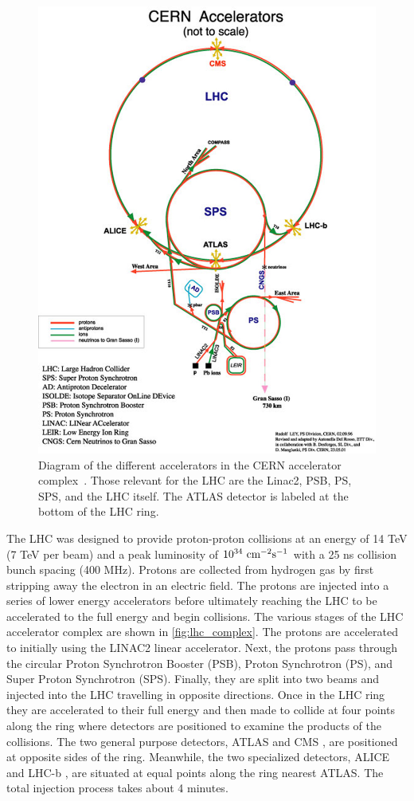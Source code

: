 \begin{figure}[ht!]
\centering
\includegraphics[width=.8\textwidth]{figures/lhc/complex.jpg}
\caption{Diagram of the different accelerators in the CERN accelerator
complex~\cite{lhccomplex}. Those relevant for the LHC are the Linac2, PSB, PS, SPS, and the LHC itself. The ATLAS detector is labeled at the bottom of the LHC ring.}
\label{eq:lhc_complex}
\end{figure}

The LHC was designed to provide proton-proton collisions
at an energy of 14 TeV (7 TeV per beam) 
and a peak luminosity of $10^{34}~\textrm{cm}^{-2}\textrm{s}^{-1}$ with a 25 ns collision
bunch spacing (400 MHz).
Protons are collected from hydrogen gas by first stripping away 
the electron in an electric field. The protons are injected
into a series of lower energy accelerators before ultimately 
reaching the LHC to be accelerated to the full energy and 
begin collisions. The various stages of the LHC accelerator
complex are shown in \fig\ref{fig:lhc_complex}.
The protons are accelerated to initially using the LINAC2 linear
accelerator. Next, the protons pass through the circular
Proton Synchrotron Booster (PSB), Proton Synchrotron (PS),
and Super Proton Synchrotron (SPS). Finally, they 
are split into two beams and injected into the LHC
travelling in opposite directions. Once in the LHC
ring they are accelerated to their full energy and then made
to collide at four points along the ring where detectors
are positioned to examine the products of the collisions.
The two general purpose detectors, ATLAS \cite{ATLAS} and CMS \cite{CMS}, 
are positioned at opposite sides of the ring. 
Meanwhile, the two specialized detectors, ALICE \cite{ALICE} 
and LHC-b \cite{LHCB}, are situated at equal points along the ring
nearest ATLAS.
The total injection process takes about 4 minutes.



